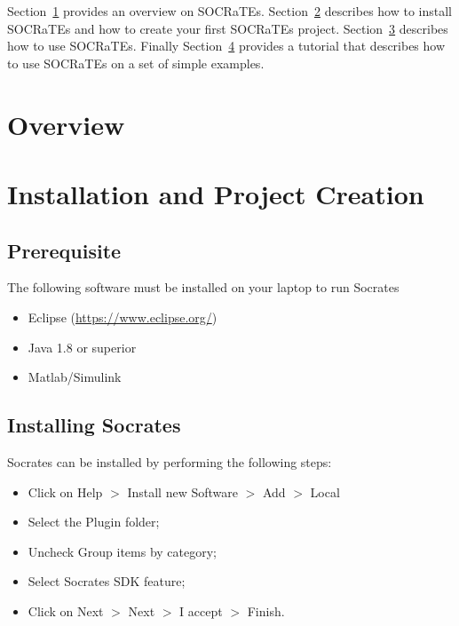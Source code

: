 Section~\protect\hyperlink{sec:Overview}{1} provides an overview on
SOCRaTEs. Section~\protect\hyperlink{sec:installation}{2} describes how
to install SOCRaTEs and how to create your first SOCRaTEs project.
Section~\protect\hyperlink{sec:using}{3} describes how to use SOCRaTEs.
Finally Section~\protect\hyperlink{sec:tutorial}{4} provides a tutorial
that describes how to use SOCRaTEs on a set of simple examples.

\hypertarget{sec:Overview}{%
\section{Overview}\label{sec:Overview}}

\hypertarget{sec:installation}{%
\section{Installation and Project Creation}\label{sec:installation}}

\hypertarget{prerequisite}{%
\subsection{Prerequisite}\label{prerequisite}}

The following software must be installed on your laptop to run Socrates

\begin{itemize}
\item
  Eclipse (\url{https://www.eclipse.org/})
\item
  Java 1.8 or superior
\item
  Matlab/Simulink
\end{itemize}

\hypertarget{installing-socrates}{%
\subsection{Installing Socrates}\label{installing-socrates}}

Socrates can be installed by performing the following steps:

\begin{itemize}
\item
  Click on Help \(>\) Install new Software \(>\) Add \(>\) Local
\item
  Select the Plugin folder;
\item
  Uncheck Group items by category;
\item
  Select Socrates SDK feature;
\item
  Click on Next \(>\) Next \(>\) I accept \(>\) Finish.
\end{itemize}

